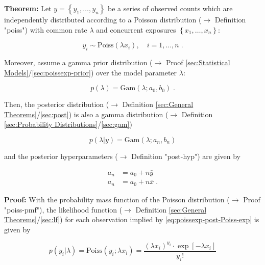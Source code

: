\documentclass[a4paper,12pt]{book}
\begin{document}
\vspace{1em}
\textbf{Theorem:} Let $y = \left\lbrace y_1, \ldots, y_n \right\rbrace$ be a series of observed counts which are independently distributed according to a Poisson distribution ($\rightarrow$ Definition "poiss") with common rate $\lambda$ and concurrent exposures $\left\lbrace x_1, \ldots, x_n \right\rbrace$:

\begin{equation} \label{eq:poissexp-post-Poiss-exp}
y_i \sim \mathrm{Poiss}(\lambda x_i), \quad i = 1, \ldots, n \; .
\end{equation}

Moreover, assume a gamma prior distribution ($\rightarrow$ Proof \ref{sec:Statistical Models}/\ref{sec:poissexp-prior}) over the model parameter $\lambda$:

\begin{equation} \label{eq:poissexp-post-Poiss-exp-prior}
p(\lambda) = \mathrm{Gam}(\lambda; a_0, b_0) \; .
\end{equation}

Then, the posterior distribution ($\rightarrow$ Definition \ref{sec:General Theorems}/\ref{sec:post}) is also a gamma distribution ($\rightarrow$ Definition \ref{sec:Probability Distributions}/\ref{sec:gam})

\begin{equation} \label{eq:poissexp-post-Poiss-exp-post}
p(\lambda|y) = \mathrm{Gam}(\lambda; a_n, b_n)
\end{equation}

and the posterior hyperparameters ($\rightarrow$ Definition "post-hyp") are given by

\begin{equation} \label{eq:poissexp-post-Poiss-exp-post-par}
\begin{split}
a_n &= a_0 + n \bar{y} \\
a_n &= a_0 + n \bar{x} \; .
\end{split}
\end{equation}


\vspace{1em}
\textbf{Proof:} With the probability mass function of the Poisson distribution ($\rightarrow$ Proof "poiss-pmf"), the likelihood function ($\rightarrow$ Definition \ref{sec:General Theorems}/\ref{sec:lf}) for each observation implied by \eqref{eq:poissexp-post-Poiss-exp} is given by

\begin{equation} \label{eq:poissexp-post-Poiss-exp-LF-s1}
p(y_i|\lambda) = \mathrm{Poiss}(y_i; \lambda x_i) = \frac{(\lambda x_i)^{y_i} \cdot \exp\left[-\lambda x_i\right]}{y_i !}
\end{equation}
\end{document}
